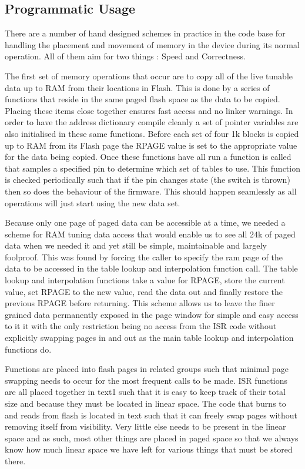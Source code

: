 \documentclass[12pt,a4paper,titlepage]{article}
\begin{document}
\begin{titlepage}
\begin{center}
\section{Programmatic Usage}

There are a number of hand designed schemes in practice in the code base for handling the placement and movement of memory in the device during its normal operation. All of them aim for two things : Speed and Correctness.

The first set of memory operations that occur are to copy all of the live tunable data up to RAM from their locations in Flash. This is done by a series of functions that reside in the same paged flash space as the data to be copied. Placing these items close together ensures fast access and no linker warnings. In order to have the address dictionary compile cleanly a set of pointer variables are also initialised in these same functions. Before each set of four 1k blocks is copied up to RAM from its Flash page the RPAGE value is set to the appropriate value for the data being copied. Once these functions have all run a function is called that samples a specified pin to determine which set of tables to use. This function is checked periodically such that if the pin changes state (the switch is thrown) then so does the behaviour of the firmware. This should happen seamlessly as all operations will just start using the new data set.

Because only one page of paged data can be accessible at a time, we needed a scheme for RAM tuning data access that would enable us to see all 24k of paged data when we needed it and yet still be simple, maintainable and largely foolproof. This was found by forcing the caller to specify the ram page of the data to be accessed in the table lookup and interpolation function call. The table lookup and interpolation functions take a value for RPAGE, store the current value, set RPAGE to the new value, read the data out and finally restore the previous RPAGE before returning. This scheme allows us to leave the finer grained data permanently exposed in the page window for simple and easy access to it it with the only restriction being no access from the ISR code without explicitly swapping pages in and out as the main table lookup and interpolation functions do.

Functions are placed into flash pages in related groups such that minimal page swapping needs to occur for the most frequent calls to be made. ISR functions are all placed together in text1 such that it is easy to keep track of their total size and because they must be located in linear space. The code that burns to and reads from flash is located in text such that it can freely swap pages without removing itself from visibility. Very little else needs to be present in the linear space and as such, most other things are placed in paged space so that we always know how much linear space we have left for various things that must be stored there.


\end{center}
\end{titlepage}
\end{document}
